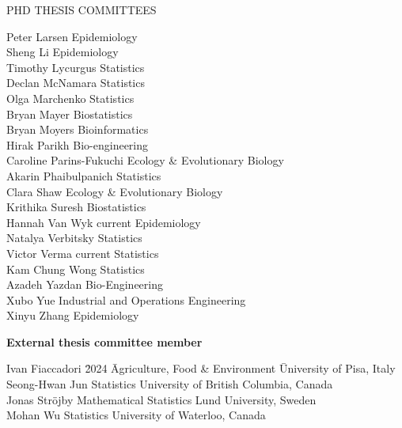 \begin{mylist}{PHD THESIS COMMITTEES}
\begin{tabbing}
Peter Larsen  \> Epidemiology\\
Sheng Li  \>Epidemiology\\
Timothy Lycurgus  \> Statistics\\
Declan McNamara  \> Statistics\\
Olga Marchenko  \> Statistics\\
Bryan Mayer  \> Biostatistics\\
Bryan Moyers \> Bioinformatics\\
Hirak Parikh  \> Bio-engineering\\
Caroline Parins-Fukuchi  \> Ecology \& Evolutionary Biology\\
Akarin Phaibulpanich  \> Statistics\\
Clara Shaw \> Ecology \& Evolutionary Biology\\
Krithika Suresh  \> Biostatistics\\
Hannah Van Wyk \> current \> Epidemiology\\
Natalya Verbitsky  \> Statistics\\
Victor Verma \> current \> Statistics\\
Kam Chung Wong  \> Statistics\\
Azadeh Yazdan  \> Bio-Engineering\\
Xubo Yue  \> Industrial and Operations Engineering\\
Xinyu Zhang  \> Epidemiology \\
\end{tabbing}

\item {\bf External thesis committee member}
\begin{tabbing}
  Ivan Fiaccadori \hspace{3mm} \= 2024 \hspace{3mm} \= Agriculture, Food \& Environment \hspace{1mm} \= University of Pisa, Italy\\
  Seong-Hwan Jun  \> Statistics \> University of British Columbia, Canada\\
Jonas Str\"{o}jby  \> Mathematical Statistics \> Lund University, Sweden\\
Mohan Wu  \> Statistics \> University of Waterloo, Canada\\
\end{tabbing}

\end{mylist}

